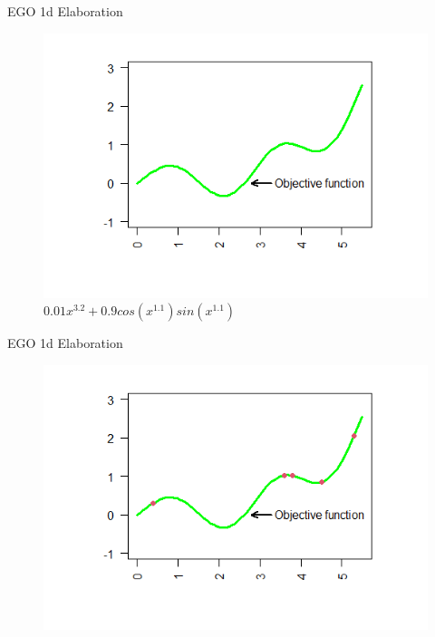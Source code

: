 \documentclass{beamer}
\begin{document}
\begin{frame}{EGO 1d Elaboration}
\begin{figure}
    \centering
    \includegraphics[scale=.7]{images/ego1d/fn1.png}
    \caption{$0.01 x^{3.2} + 0.9  cos(x^{1.1}) sin(x^{1.1})$}
    \label{fig:f1}
\end{figure}
\end{frame}

\begin{frame}{EGO 1d Elaboration}
\begin{figure}
    \centering
    \includegraphics[scale=.7]{images/ego1d/fn2.png}
    \label{fig:f2}
\end{figure}
\end{frame}
\end{document}
